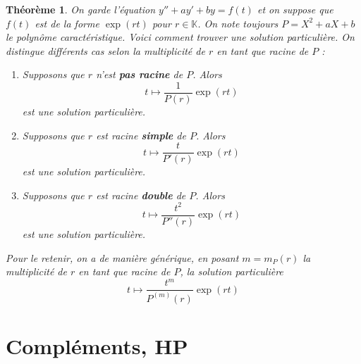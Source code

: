 \documentclass[french]{book}
\newcommand{\K}{\mathbb{K}}
\theoremstyle{plain}
\newtheorem{thm}{Théorème}[chapter]
\theoremstyle{definition}
\theoremstyle{remark}
\begin{document}
\begin{thm}
	On garde l'équation $y''+ay'+by=f(t)$ et on suppose que $f(t)$ est de la forme $\exp(rt)$ pour $r\in\K$. On note toujours $P=X^2+aX+b$ le polynôme caractéristique. Voici comment trouver une solution particulière. On distingue différents cas selon la multiplicité de $r$ en tant que racine de $P$ :
	\begin{enumerate}
		\item Supposons que $r$ n'est \textbf{pas racine} de $P$. Alors $$t\mapsto\frac{1}{P(r)}\exp(rt)$$ est une solution particulière.
		\item Supposons que $r$ est racine \textbf{simple} de $P$. Alors $$t\mapsto\frac{t}{P'(r)}\exp(rt)$$ est une solution particulière.
		\item Supposons que $r$ est racine \textbf{double} de $P$. Alors $$t\mapsto\frac{t^2}{P''(r)}\exp(rt)$$ est une solution particulière.
	\end{enumerate}
	Pour le retenir, on a de manière générique, en posant $m=m_P(r)$ la multiplicité de $r$ en tant que racine de $P$, la solution particulière $$t\mapsto \frac{t^m}{P^{(m)}(r)}\exp(rt)$$
\end{thm}
\section{Compléments, HP}
\end{document}
